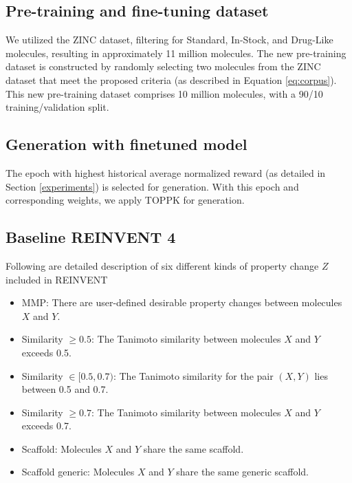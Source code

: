 {
\subsection{Pre-training and fine-tuning dataset}\label{app:pretrain_data} 

We utilized the ZINC dataset, filtering for Standard, In-Stock, and Drug-Like molecules, resulting in approximately 11 million molecules.
The new pre-training dataset is constructed by randomly selecting two molecules from the ZINC dataset that meet the proposed criteria (as described in Equation \ref{eq:corpus}). This new pre-training dataset comprises 10 million molecules, with a 90/10 training/validation split.

}

{
\subsection{Generation with finetuned model} \label{app:generation} 
The epoch with highest historical average normalized reward (as detailed in Section \ref{experiments}) is selected for generation. 
With this epoch and corresponding weights, we apply TOPPK\citep{liu2024erp} for generation. 
}


{
\subsection{Baseline REINVENT 4} \label{app:reinvent}
Following are detailed description of six different kinds of property change $Z$ included in REINVENT \citet{he2022transformer, he2021molecular}
\begin{itemize}
    \item {MMP:} There are user-defined desirable property changes between molecules $X$ and $Y$.
    \item {Similarity $\geq 0.5$:} The Tanimoto similarity between molecules $X$ and $Y$ exceeds 0.5.
    \item {Similarity $\in [0.5, 0.7)$:} The Tanimoto similarity for the pair $\left(X, Y\right)$ lies between 0.5 and 0.7.
    \item {Similarity $\geq 0.7$:} The Tanimoto similarity between molecules $X$ and $Y$ exceeds 0.7.
    \item {Scaffold:} Molecules $X$ and $Y$ share the same scaffold.
    \item {Scaffold generic:} Molecules $X$ and $Y$ share the same generic scaffold.
\end{itemize}}

